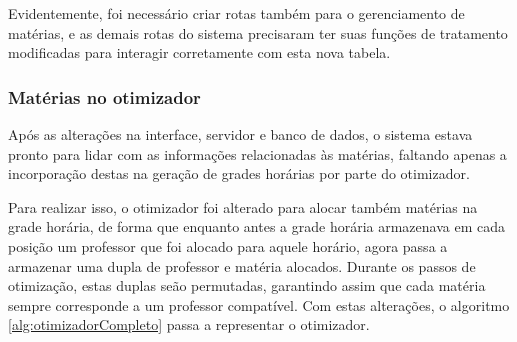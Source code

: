 Evidentemente, foi necessário criar rotas também para o gerenciamento de matérias, e as demais rotas do sistema precisaram ter suas funções de tratamento modificadas para interagir corretamente com esta nova tabela.

\subsubsection{Matérias no otimizador}
Após as alterações na interface, servidor e banco de dados, o sistema estava pronto para lidar com as informações relacionadas às matérias, faltando apenas a incorporação destas na geração de grades horárias por parte do otimizador. 

Para realizar isso, o otimizador foi alterado para alocar também matérias na grade horária, de forma que enquanto antes a grade horária armazenava em cada posição um professor que foi alocado para aquele horário, agora passa a armazenar uma dupla de professor e matéria alocados. Durante os passos de otimização, estas duplas seão permutadas, garantindo assim que cada matéria sempre corresponde a um professor compatível. Com estas alterações, o algoritmo \ref{alg:otimizadorCompleto} passa a representar o otimizador.


